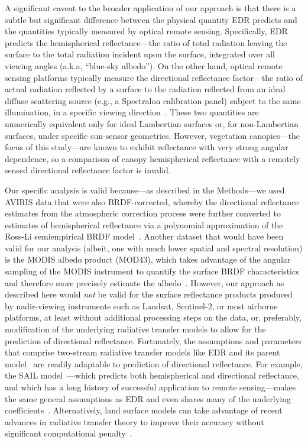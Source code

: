 A significant caveat to the broader application of our approach is that there is a subtle but significant difference between the physical quantity EDR predicts and the quantities typically measured by optical remote sensing.
Specifically, EDR predicts the hemispherical reflectance---the ratio of total radiation leaving the surface to the total radiation incident upon the surface, integrated over all viewing angles (a.k.a, ``blue-sky albedo'').
On the other hand, optical remote sensing platforms typically measure the directional reflectance factor---the ratio of actual radiation reflected by a surface to the radiation reflected from an ideal diffuse scattering source (e.g., a Spectralon calibration panel) subject to the same illumination, in a specific viewing direction~\citep{schaepman-strub2006reflectance}.
These two quantities are numerically equivalent only for ideal Lambertian surfaces or, for non-Lambertian surfaces, under specific sun-sensor geometries.
However, vegetation canopies---the focus of this study---are known to exhibit reflectance with very strong angular dependence, so a comparison of canopy hemispherical reflectance with a remotely sensed directional reflectance factor is invalid.

Our specific analysis is valid because---as described in the Methods---we used AVIRIS data that were also BRDF-corrected, whereby the directional reflectance estimates from the atmospheric correction process were further converted to estimates of hemispherical reflectance via a polynomial approximation of the Ross-Li semiempirical BRDF model~\citep{lucht2000algorithm}.
Another dataset that would have been valid for our analysis (albeit, one with much lower spatial and spectral resolution) is the MODIS albedo product (MOD43), which takes advantage of the angular sampling of the MODIS instrument to quantify the surface BRDF characteristics and therefore more precisely estimate the albedo~\citep{wang2004using, schaaf2015mcd43a1}.
However, our approach as described here would \emph{not} be valid for the surface reflectance products produced by nadir-viewing instruments such as Landsat, Sentinel-2, or most airborne platforms, at least without additional processing steps on the data,
or, preferably, modification of the underlying radiative transfer models to allow for the prediction of directional reflectance.
Fortunately, the assumptions and parameters that comprise two-stream radiative transfer models like EDR and its parent model~\citep{sellers1985canopy} are readily adaptable to prediction of directional reflectance.
For example, the SAIL model~\citep{verhoef1984light, verhoef2007coupled}---which predicts both hemispherical and directional reflectance, and which has a long history of successful application to remote sensing---makes the same general assumptions as EDR and even shares many of the underlying coefficients~\citep{yuan2017reexamination}.
Alternatively, land surface models can take advantage of recent advances in radiative transfer theory to improve their accuracy without significant computational penalty~\citep[e.g.,][]{hogan_2018_fast}.

